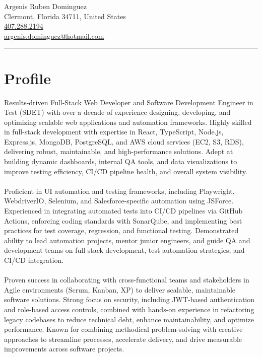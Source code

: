 \documentclass[letterpaper,10pt]{article}
\newcommand{\separator}{\vspace{4pt}\hrule\vspace{4pt}}
\begin{document}
\begin{center}
  {\Huge Argenis Ruben Dominguez} \\
  Clermont, Florida 34711, United States \\
  \href{tel:4072882194}{407.288.2194} \\
  \href{mailto:argenis.dominguez@hotmail.com}{argenis.dominguez@hotmail.com} \\ 
\end{center}
\separator

\section*{Profile}
Results-driven Full-Stack Web Developer and Software Development Engineer in Test (SDET) with over a decade of experience designing, developing, and optimizing scalable web applications and automation frameworks. Highly skilled in full-stack development with expertise in React, TypeScript, Node.js, Express.js, MongoDB, PostgreSQL, and AWS cloud services (EC2, S3, RDS), delivering robust, maintainable, and high-performance solutions. Adept at building dynamic dashboards, internal QA tools, and data visualizations to improve testing efficiency, CI/CD pipeline health, and overall system visibility. \\ \\ Proficient in UI automation and testing frameworks, including Playwright, WebdriverIO, Selenium, and Salesforce-specific automation using JSForce. Experienced in integrating automated tests into CI/CD pipelines via GitHub Actions, enforcing coding standards with SonarQube, and implementing best practices for test coverage, regression, and functional testing. Demonstrated ability to lead automation projects, mentor junior engineers, and guide QA and development teams on full-stack development, test automation strategies, and CI/CD integration. \\ \\ Proven success in collaborating with cross-functional teams and stakeholders in Agile environments (Scrum, Kanban, XP) to deliver scalable, maintainable software solutions. Strong focus on security, including JWT-based authentication and role-based access controls, combined with hands-on experience in refactoring legacy codebases to reduce technical debt, enhance maintainability, and optimize performance. Known for combining methodical problem-solving with creative approaches to streamline processes, accelerate delivery, and drive measurable improvements across software projects. \\ \\
\end{document}
